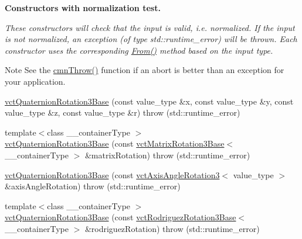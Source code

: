 \begin{Indent}{\bf Constructors with normalization test.}\par
{\em These constructors will check that the input is valid, i.\+e. normalized. If the input is not normalized, an exception (of type {\ttfamily std\+::runtime\+\_\+error}) will be thrown. Each constructor uses the corresponding \hyperlink{classvct_quaternion_rotation3_base_a24fb234e60ece7a6b04f6f53339f38fe}{From()} method based on the input type.

\begin{DoxyNote}{Note}
See the \hyperlink{_minimal_cmn_8h_ad50e82cf9c9dbd0e6443c13e0d1a6f1a}{cmn\+Throw()} function if an {\ttfamily abort} is better than an exception for your application. 
\end{DoxyNote}
}\begin{DoxyCompactItemize}
\item 
\hyperlink{classvct_quaternion_rotation3_base_ae39ee6bfd8b77e8e6b6b9ed4018822d3}{vct\+Quaternion\+Rotation3\+Base} (const value\+\_\+type \&x, const value\+\_\+type \&y, const value\+\_\+type \&z, const value\+\_\+type \&r)  throw (std\+::runtime\+\_\+error)
\item 
{\footnotesize template$<$class \+\_\+\+\_\+container\+Type $>$ }\\\hyperlink{classvct_quaternion_rotation3_base_a505f35ee8b57e613635d603cda8fd2ef}{vct\+Quaternion\+Rotation3\+Base} (const \hyperlink{classvct_matrix_rotation3_base}{vct\+Matrix\+Rotation3\+Base}$<$ \+\_\+\+\_\+container\+Type $>$ \&matrix\+Rotation)  throw (std\+::runtime\+\_\+error)
\item 
\hyperlink{classvct_quaternion_rotation3_base_a2d5c41c767010bc9b7542841fdeb5dce}{vct\+Quaternion\+Rotation3\+Base} (const \hyperlink{classvct_axis_angle_rotation3}{vct\+Axis\+Angle\+Rotation3}$<$ value\+\_\+type $>$ \&axis\+Angle\+Rotation)  throw (std\+::runtime\+\_\+error)
\item 
{\footnotesize template$<$class \+\_\+\+\_\+container\+Type $>$ }\\\hyperlink{classvct_quaternion_rotation3_base_a1faf412df8da0e58bdf71ee5fd6047dd}{vct\+Quaternion\+Rotation3\+Base} (const \hyperlink{classvct_rodriguez_rotation3_base}{vct\+Rodriguez\+Rotation3\+Base}$<$ \+\_\+\+\_\+container\+Type $>$ \&rodriguez\+Rotation)  throw (std\+::runtime\+\_\+error)
\end{DoxyCompactItemize}
\end{Indent}
